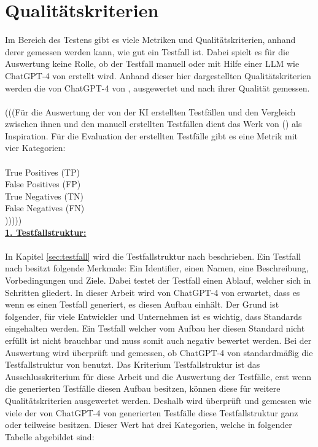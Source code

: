 \documentclass[12pt,toc=bib,toc=listof]{scrreprt}
\begin{document}
\section{Qualitätskriterien} %
\label{sec:qualitätskriterien}
Im Bereich des Testens gibt es viele Metriken und Qualitätskriterien, anhand derer gemessen werden kann, wie gut ein Testfall ist. Dabei spielt es für die Auswertung keine Rolle, ob der Testfall manuell oder mit Hilfe einer LLM wie ChatGPT-4 von \textcite{OpenAI2025} erstellt wird. Anhand dieser hier dargestellten Qualitätskriterien werden die von ChatGPT-4 von \textcite{OpenAI2025}, ausgewertet und nach ihrer Qualität gemessen.\\
\\
(((Für die Auswertung der von der KI erstellten Testfällen und den Vergleich zwischen ihnen und den manuell erstellten Testfällen dient das Werk von (\cite{Wang2024}) als Inspiration. Für die Evaluation der erstellten Testfälle gibt es eine Metrik mit vier Kategorien:\\
\\
True Positives (TP)\\
False Positives (FP)\\
True Negatives (TN)\\ 
False Negatives (FN)\\)))))
\\
\textbf{\underline{1. Testfallstruktur:}}\\
\\
In Kapitel \ref{sec:testfall} wird die Testfallstruktur nach \textcite{IsoIecIeee2024} beschrieben. Ein Testfall nach \textcite{IsoIecIeee2024} besitzt folgende Merkmale: Ein Identifier, einen Namen, eine Beschreibung, Vorbedingungen und Ziele. Dabei testet der Testfall einen Ablauf, welcher sich in Schritten gliedert. In dieser Arbeit wird von ChatGPT-4 von \textcite{OpenAI2025} erwartet, dass es wenn es einen Testfall generiert, es diesen Aufbau einhält. Der Grund ist folgender, für viele Entwickler und Unternehmen ist es wichtig, dass Standards eingehalten werden. Ein Testfall welcher vom Aufbau her diesen Standard nicht erfüllt ist nicht brauchbar und muss somit auch negativ bewertet werden. Bei der Auswertung wird überprüft und gemessen, ob ChatGPT-4 von \textcite{OpenAI2025} standardmäßig die Testfallstruktur von \textcite{IsoIecIeee2024} benutzt. Das Kriterium Testfallstruktur ist das Ausschlusskriterium für diese Arbeit und die Auswertung der Testfälle, erst wenn die generierten Testfälle diesen Aufbau besitzen, können diese für weitere Qualitätskriterien ausgewertet werden. Deshalb wird überprüft und gemessen wie viele der von ChatGPT-4 von \textcite{OpenAI2025} generierten Testfälle diese Testfallstruktur ganz oder teilweise besitzen. Dieser Wert hat drei Kategorien, welche in folgender Tabelle abgebildet sind:\\
\end{document}
